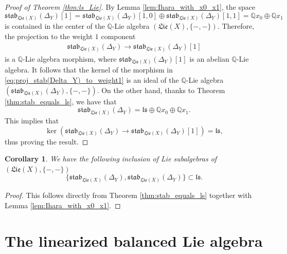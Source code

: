 \documentclass[11pt, a4paper]{amsart}
\newtheorem{corollary}[theorem]{Corollary}
\numberwithin{equation}{section}
\theoremstyle{definition}
\newcommand{\Q}{\mathbb{Q}}
\newcommand{\ls}{\mathfrak{ls}}
\newcommand{\Lie}{\mathfrak{Lie}}
\newcommand{\stab}{\mathfrak{stab}}
\begin{document}

\begin{proof}[Proof of Theorem \ref{thm:ls_Lie}]
By Lemma \ref{lem:Ihara_with_x0_x1}, the space 
\[\stab_{\Lie(X)}(\Delta_Y)[1]=\stab_{\Lie(X)}(\Delta_Y)[1,0]\oplus \stab_{\Lie(X)}(\Delta_Y)[1,1]=\Q x_0 \oplus \Q x_1\] is contained in the center of the $\Q$-Lie algebra $(\Lie(X), \{-,-\})$. Therefore, the projection to the weight $1$ component
\begin{align} \label{eq:proj_stab(Delta_Y)_to_weight1}
\stab_{\Lie(X)}(\Delta_Y) \to \stab_{\Lie(X)}(\Delta_Y)[1]
\end{align}
is a $\Q$-Lie algebra morphism, where $\stab_{\Lie(X)}(\Delta_Y)[1]$ is an abelian $\Q$-Lie algebra. It follows that the kernel of the morphism in \eqref{eq:proj_stab(Delta_Y)_to_weight1} is an ideal of the $\Q$-Lie algebra $(\stab_{\Lie(X)}(\Delta_Y), \{-,-\})$. On the other hand, thanks to Theorem \ref{thm:stab_equals_ls}, we have that
\[
\stab_{\Lie(X)}(\Delta_Y) = \mathfrak{ls} \oplus \Q x_0 \oplus \Q x_1.
\]
This implies that
\[
\ker\left(\stab_{\Lie(X)}(\Delta_Y) \to \stab_{\Lie(X)}(\Delta_Y)[1]\right) = \mathfrak{ls}, 
\]
thus proving the result.
\end{proof}

\begin{corollary} We have the following inclusion of Lie subalgebras of $(\Lie(X),\{-,-\})$
\[
\{\stab_{\Lie(X)}(\Delta_Y),\stab_{\Lie(X)}(\Delta_Y)\}\subset \ls.
\]
\end{corollary}

\begin{proof} This follows directly from Theorem \ref{thm:stab_equals_ls} together with Lemma \ref{lem:Ihara_with_x0_x1}.
\end{proof}

\section{The linearized balanced Lie algebra} \label{sec:lq}
\end{document}

